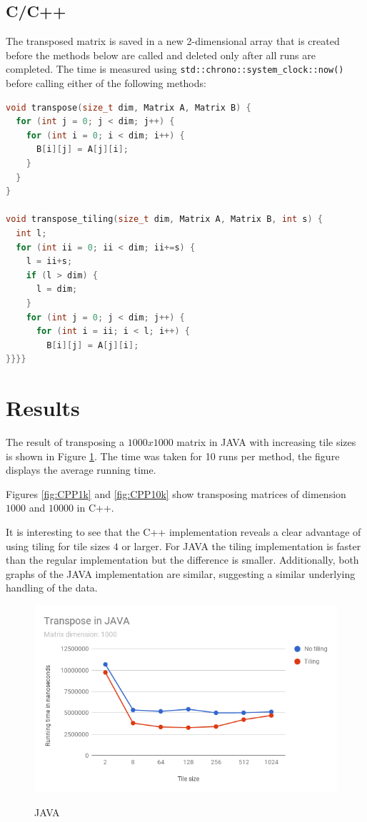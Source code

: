 \documentclass[
    12pt,
    a4paper,
    oneside, 
    headinclude,footinclude,
    BCOR5mm,
]{scrartcl}
\begin{document}
\subsection*{C/C++}

The transposed matrix is saved in a new 2-dimensional array that is created before the methods below are called and deleted only after all runs are completed.
The time is measured using \texttt{std::chrono::system\_clock::now()} before calling either of the following methods:


\begin{lstlisting}[language=C++, caption=Transpose methods in C++]
void transpose(size_t dim, Matrix A, Matrix B) {
  for (int j = 0; j < dim; j++) {
    for (int i = 0; i < dim; i++) {
      B[i][j] = A[j][i];
    }
  }
}

void transpose_tiling(size_t dim, Matrix A, Matrix B, int s) {
  int l;
  for (int ii = 0; ii < dim; ii+=s) {
    l = ii+s;
    if (l > dim) {
      l = dim;
    }
    for (int j = 0; j < dim; j++) {
      for (int i = ii; i < l; i++) {
        B[i][j] = A[j][i];
}}}}

\end{lstlisting}

\section*{Results}

The result of transposing a $1000x1000$ matrix in JAVA with increasing tile sizes is shown in Figure \ref{fig:JAVA}. 
The time was taken for 10 runs per method, the figure displays the average running time.

Figures \ref{fig:CPP1k} and \ref{fig:CPP10k} show transposing matrices of dimension $1000$ and $10000$ in C++.

It is interesting to see that the C++ implementation reveals a clear advantage of using tiling for tile sizes $4$ or larger.
For JAVA the tiling implementation is faster than the regular implementation but the difference is smaller. 
Additionally, both graphs of the JAVA implementation are similar, suggesting a similar underlying handling of the data.

\begin{figure}
\includegraphics[scale=0.5]{figures/JAVAdifTile1000.png}
\label{fig:JAVA}
\caption{JAVA}
\end{figure}
\end{document}
